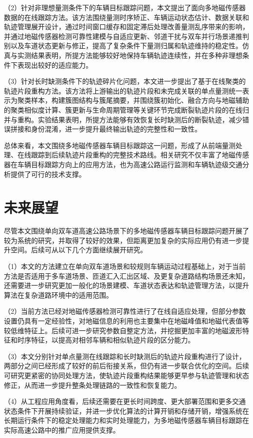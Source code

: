 \documentclass{xdupgthesis}
\begin{document}
（2）针对非理想量测条件下的车辆目标跟踪问题，本文提出了面向多地磁传感器数据的在线跟踪方法。该方法围绕量测时序矫正、车辆运动状态估计、数据关联和轨迹管理展开设计，通过时间窗口缓存和固定滞后处理改善量测乱序带来的影响，并通过地磁传感器检测可靠性建模与自适应更新、邻道干扰与双车并行场景递推判别以及车道状态更新与修正，提高了复杂条件下量测归属和轨迹维持的稳定性。仿真与实测结果表明，所提方法能够较好地保持车辆轨迹连续性，并在多种非理想条件下表现出较好的适应能力。

（3）针对长时缺测条件下的轨迹碎片化问题，本文进一步提出了基于在线聚类的轨迹片段重构方法。该方法将上游输出的轨迹片段和未完成关联的单点量测统一表示为聚类样本，构建簇图结构与簇尾摘要，并围绕簇初始化、融合方向与地磁辅助的聚类相似度计算、簇更新与生命周期管理等关键环节完成断裂轨迹片段的在线归并与重构。实验结果表明，所提方法能够有效恢复长时缺测后的断裂轨迹，减少错误拼接和身份混淆，进一步提升最终输出轨迹的完整性和一致性。

总体来看，本文围绕多地磁传感器车辆目标跟踪这一问题，形成了从前端量测处理、在线跟踪到后续轨迹片段重构的完整技术路线。相关研究不仅丰富了地磁传感器在车辆目标跟踪方向上的应用方法，也为高速公路运行监测和车辆轨迹级交通分析提供了可行的技术支撑。

\section{未来展望}

尽管本文围绕单向双车道高速公路场景下的多地磁传感器车辆目标跟踪问题开展了较为系统的研究，并取得了较好的效果，但距离更加复杂的实际应用仍有进一步提升空间。后续可从以下几个方面继续展开研究。

（1）本文的方法建立在单向双车道场景和较规则车辆运动过程基础上，对于当前方法是否适用于多车道场景、匝道汇入汇出区域、及更复杂道路结构场景还未知，还需要进一步研究更加一般化的场景建模、车道状态表达和轨迹管理方法，以提升算法在复杂道路环境中的适用范围。

（2）当前方法已经对地磁传感器检测可靠性进行了在线自适应处理，但部分参数设置仍具有一定经验性，对地磁信息的利用也主要集中在地磁峰值和地磁代表值等较低维特征上。后续可进一步研究参数自整定方法，并挖掘更加丰富的地磁波形特征和时序特征，以提高对相邻车辆和相似轨迹片段的区分能力。

（3）本文分别针对单点量测在线跟踪和长时缺测后的轨迹片段重构进行了设计，两部分之间已经形成了较好的前后衔接关系，但仍有进一步联合优化的空间。后续可研究更紧密的协同处理方法，使轨迹片段重构结果能够更早参与轨迹管理和状态修正，从而进一步提升整条处理链路的一致性和恢复能力。

（4）从工程应用角度看，后续还需要在更长时间跨度、更大部署范围和更多交通状态条件下开展持续验证，并进一步优化算法的计算开销和存储开销，增强系统在长期运行条件下的稳定处理能力和实时处理能力，为多地磁传感器车辆目标跟踪在实际高速公路中的推广应用提供支撑。
\end{document}
